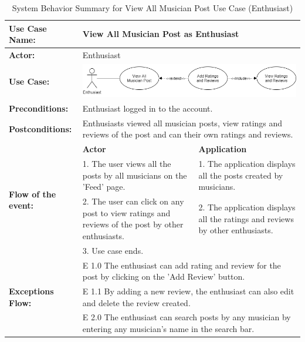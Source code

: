 \begin{longtable}{|p{3cm}|p{5cm}|p{5cm}|}
    \caption{System Behavior Summary for View All Musician Post Use Case (Enthusiast)} \\
    \hline
    \textbf{Use Case Name:} & \multicolumn{2}{l|}{View All Musician Post as Enthusiast} \\ \hline
    \textbf{Actor:} & \multicolumn{2}{l|}{Enthusiast} \\ \hline
    \textbf{Use Case:} & \multicolumn{2}{l|}{\includegraphics[width=0.5\linewidth]{mainmatter/images/sucd10.png}} \\ \hline
    \textbf{Preconditions:} & \multicolumn{2}{p{10cm}|}{Enthusiast logged in to the account.} \\ \hline
    \textbf{Postconditions:} & \multicolumn{2}{p{10cm}|}{Enthusiasts viewed all musician posts, view ratings and reviews of the post and can their own ratings and reviews.} \\ \hline
    \multirow{4}{3cm}{\raggedright \textbf{Flow of the event:}} & \textbf{Actor} & \textbf{Application} \\ \cline{2-3}
    & 1. The user views all the posts by all musicians on the 'Feed' page. & 1. The application displays all the posts created by musicians. \\ \cline{2-3}
    & 2. The user can click on any post to view ratings and reviews of the post by other enthusiasts. & 2. The application displays all the ratings and reviews by other enthusiasts.  \\ \cline{2-3}
    & 3. Use case ends. & \\ \hline
    \multirow{3}{3cm}{\raggedright \textbf{Exceptions Flow:}} & \multicolumn{2}{p{10cm}|}{\raggedright E 1.0 The enthusiast can add rating and review for the post by clicking on the 'Add Review' button.} \\ \cline{2-3}
    & \multicolumn{2}{p{10cm}|}{\raggedright E 1.1 By adding a new review, the enthusiast can also edit and delete the review created.} \\ \cline{2-3}
    & \multicolumn{2}{p{10cm}|}{\raggedright E 2.0 The enthusiast can search posts by any musician by entering any musician's name in the search bar.} \\ \hline
\end{longtable}
\pagebreak

